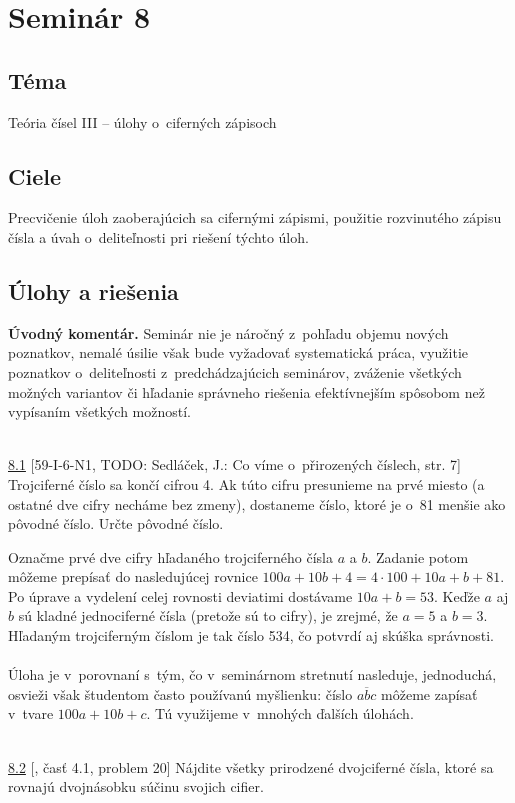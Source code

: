 \section*{Seminár 8}


\subsection*{Téma}
Teória čísel III -- úlohy o~ciferných zápisoch
\subsection*{Ciele}
Precvičenie úloh zaoberajúcich sa cifernými zápismi, použitie rozvinutého zápisu čísla a úvah o~deliteľnosti pri riešení týchto úloh.

\subsection*{Úlohy a riešenia}

\textbf{Úvodný komentár.} Seminár nie je náročný z~pohľadu objemu nových poznatkov, nemalé úsilie však bude vyžadovať systematická práca, využitie poznatkov o~deliteľnosti z~predchádzajúcich seminárov, zváženie všetkých možných variantov či hľadanie správneho riešenia efektívnejším spôsobom než vypísaním všetkých možností.\\
\\
\begin{tcolorbox}[breakable,notitle,boxrule=0pt,colback=light-gray,colframe=light-gray]\ul{8.1} [59-I-6-N1, TODO: Sedláček, J.: Co víme o~přirozených číslech, str. 7] Trojciferné číslo sa končí cifrou 4. Ak túto cifru presunieme na prvé miesto (a ostatné dve cifry necháme bez zmeny), dostaneme číslo, ktoré je o~81 menšie ako pôvodné číslo. Určte pôvodné číslo.

\end{tcolorbox}

\rie Označme prvé dve cifry hľadaného trojciferného čísla $a$ a $b$. Zadanie potom môžeme prepísať do nasledujúcej rovnice $100a+10b+4=4\cdot 100 + 10a+b+81$. Po úprave a vydelení celej rovnosti deviatimi dostávame $10a+b=53$. Keďže $a$ aj $b$ sú kladné jednociferné čísla (pretože sú to cifry), je zrejmé, že $a=5$ a $b=3$. Hľadaným trojciferným číslom je tak číslo 534, čo potvrdí aj skúška správnosti. \\
\\
\kom Úloha je v~porovnaní s~tým, čo v~seminárnom stretnutí nasleduje, jednoduchá, osvieži však študentom často používanú myšlienku: číslo $\overline{abc}$ môžeme zapísať v~tvare $100a+10b+c$. Tú využijeme v~mnohých ďalších úlohách.\\
\\
\begin{tcolorbox}[breakable,notitle,boxrule=0pt,colback=light-gray,colframe=light-gray]\ul{8.2} [\cite{holton2010}, časť 4.1, problem 20] Nájdite všetky prirodzené dvojciferné čísla, ktoré sa rovnajú dvojnásobku súčinu svojich cifier.

\end{tcolorbox}

